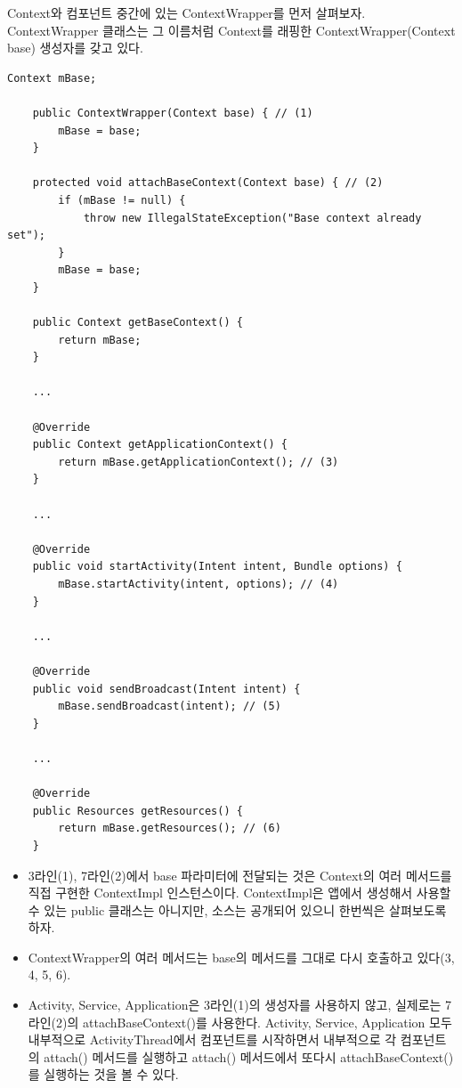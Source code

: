 Context와 컴포넌트 중간에 있는 ContextWrapper를 먼저 살펴보자.
ContextWrapper 클래스는 그 이름처럼 Context를 래핑한 ContextWrapper(Context base) 생성자를 갖고 있다.
\begin{lstlisting}[frame=single, caption=ContextWrapper.java]
    Context mBase;

    public ContextWrapper(Context base) { // (1)
        mBase = base;
    }

	protected void attachBaseContext(Context base) { // (2)
        if (mBase != null) {
            throw new IllegalStateException("Base context already set");
        }
        mBase = base;
    }
    
    public Context getBaseContext() {
        return mBase;
    }
    
    ...
    
    @Override
    public Context getApplicationContext() {
        return mBase.getApplicationContext(); // (3)
    }
    
    ...
    
    @Override
    public void startActivity(Intent intent, Bundle options) {
        mBase.startActivity(intent, options); // (4)
    }
    
    ...
    
    @Override
    public void sendBroadcast(Intent intent) {
        mBase.sendBroadcast(intent); // (5)
    }

	... 
	
    @Override
    public Resources getResources() {
        return mBase.getResources(); // (6)
    }
\end{lstlisting}
\begin{itemize}
\item 3라인(1), 7라인(2)에서 base 파라미터에 전달되는 것은 Context의 여러 메서드를 직접 구현한 ContextImpl 인스턴스이다. 
ContextImpl은 앱에서 생성해서 사용할 수 있는 public 클래스는 아니지만, 소스는 공개되어 있으니 한번씩은 살펴보도록 하자.

\item ContextWrapper의 여러 메서드는 base의 메서드를 그대로 다시 호출하고 있다(3, 4, 5, 6).

\item Activity, Service, Application은 3라인(1)의 생성자를 사용하지 않고, 실제로는 7라인(2)의 attachBaseContext()를 사용한다. Activity, Service, Application 모두 내부적으로 ActivityThread에서 컴포넌트를 시작하면서 내부적으로 각 컴포넌트의 attach() 메서드를 실행하고 attach() 메서드에서 또다시 attachBaseContext()를 실행하는 것을 볼 수 있다.
\end{itemize}

